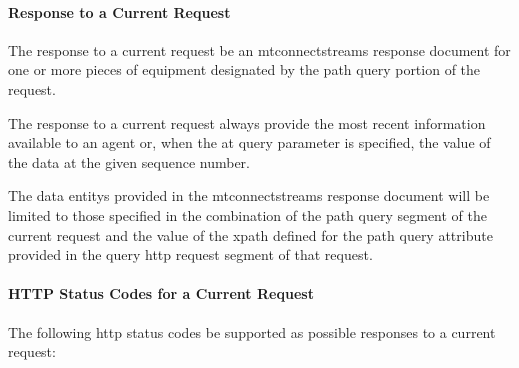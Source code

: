 \documentclass{mtconnect}	%
\begin{document}
\paragraph{Response to a Current Request}\mbox{}

The \gls{response} to a \gls{current request} \SHOULD be an \gls{mtconnectstreams response document} for one or more pieces of equipment designated by the \gls{path query} portion of the \gls{request}.

The \gls{response} to a \gls{current request} \MUST always provide the most recent information available to an \gls{agent} or, when the \gls{at query} parameter is specified, the value of the data at the given \gls{sequence number}.

The \glspl{data entity} provided in the \gls{mtconnectstreams response document} will be limited to those specified in the combination of the \gls{path query} segment of the \gls{current request} and the value of the \gls{xpath} defined for the \gls{path query} attribute provided in the \gls{query http request} segment of that \gls{request}. 

\paragraph{HTTP Status Codes for a Current Request}\mbox{}

The following \glspl{http status code} \MUST be supported as possible responses to a \gls{current request}:
\end{document}
